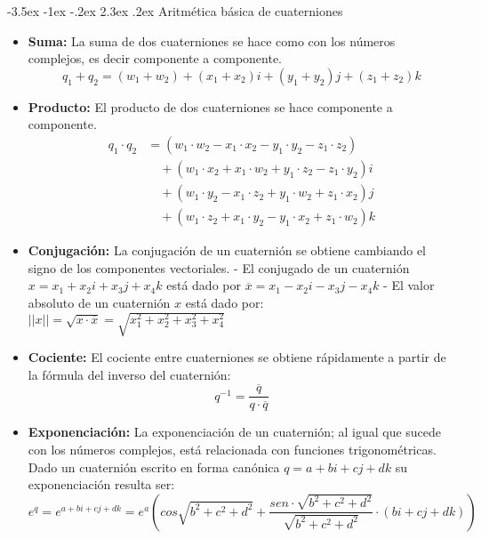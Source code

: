 \documentclass[11pt]{report}
\makeatletter
\renewcommand\chapter{\@startsection{chapter}{0}{\z@}%
    {-3.5ex \@plus -1ex \@minus -.2ex}%
    {2.3ex \@plus.2ex}%
    {\normalfont\Large\bfseries}}
\makeatother
\begin{document}
\newpage

\chapter{Aritmética básica de cuaterniones}
\begin{itemize}
  \item \textbf{Suma:} La suma de dos cuaterniones se hace como con los números complejos, es decir componente a componente.
        \begin{equation*}
          q_1 + q_2 = (w_1 + w_2) + (x_1 + x_2)i + (y_1 + y_2)j + (z_1 + z_2)k
        \end{equation*}
  \item \textbf{Producto:} El producto de dos cuaterniones se hace componente a componente.
        \begin{align*}
          q_1 \cdot q_2 & = (w_1 \cdot w_2 - x_1 \cdot x_2 - y_1 \cdot y_2 - z_1 \cdot z_2)        \\
                        & \quad + (w_1 \cdot x_2 + x_1 \cdot w_2 + y_1 \cdot z_2 - z_1 \cdot y_2)i \\
                        & \quad + (w_1 \cdot y_2 - x_1 \cdot z_2 + y_1 \cdot w_2 + z_1 \cdot x_2)j \\
                        & \quad + (w_1 \cdot z_2 + x_1 \cdot y_2 - y_1 \cdot x_2 + z_1 \cdot w_2)k
        \end{align*}
  \item \textbf{Conjugación:} La conjugación de un cuaternión se obtiene cambiando el signo de los componentes vectoriales.
        \subitem - El conjugado de un cuaternión $x = x_1 + x_2i +x_3j + x_4k$ está dado por $\overline{x} = x_1 - x_2i -x_3j - x_4k$
        \subitem - El valor absoluto de un cuaternión $x$ está dado por: $||x|| = \sqrt{x \cdot \overline{x}} = \sqrt{x_1^2 + x_2^2 + x_3^2 + x_4^2}$
  \item \textbf{Cociente:} El cociente entre cuaterniones se obtiene rápidamente a partir de la fórmula del inverso del cuaternión:
        \begin{equation*}
          q^{-1} = \frac{\overline{q}}{q \cdot \overline{q}}
        \end{equation*}
  \item \textbf{Exponenciación:} La exponenciación de un cuaternión; al igual que sucede con los números complejos, está relacionada con
        funciones trigonométricas. Dado un cuaternión escrito en forma canónica $q = a + bi +cj + dk$ su exponenciación resulta ser:
        \begin{equation*}
          e^q = e^{a+bi+cj+dk} = e^a \left( cos\sqrt{b^2+c^2+d^2} + \frac{sen \cdot \sqrt{b^2+c^2+d^2}}{\sqrt{b^2+c^2+d^2}} \cdot (bi + cj + dk) \right)
        \end{equation*}
\end{itemize}
\end{document}
